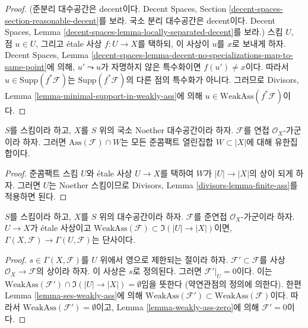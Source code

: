 \begin{proof}
(준분리 대수공간은 decent이다. Decent Spaces, Section
\ref{decent-spaces-section-reasonable-decent}를 보라.
국소 분리 대수공간은 decent이다. Decent Spaces, Lemma
\ref{decent-spaces-lemma-locally-separated-decent}를 보라.)
스킴 $U$, 점 $u \in U$, 그리고 \'etale 사상
$f : U \to X$를 택하되, 이 사상이 $u$를 $x$로 보내게 하자.
Decent Spaces, Lemma
\ref{decent-spaces-lemma-decent-no-specializations-map-to-same-point}에 의해,
$u' \leadsto u$가 자명하지 않은 특수화이면 $f(u') \not = x$이다.
따라서 $u \in \text{Supp}(f^*\mathcal{F})$는
$\text{Supp}(f^*\mathcal{F})$의 다른 점의 특수화가 아니다.
그러므로 Divisors, Lemma
\ref{lemma-minimal-support-in-weakly-ass}에 의해
$u \in \text{WeakAss}(f^*\mathcal{F})$이다.
\end{proof}

\begin{lemma}
\label{lemma-finite-ass}
$S$를 스킴이라 하고, $X$를 $S$ 위의 국소 Noether 대수공간이라 하자.
$\mathcal{F}$를 연접 $\mathcal{O}_X$-가군이라 하자. 그러면
$\text{Ass}(\mathcal{F}) \cap W$는 모든 준콤팩트 열린집합
$W \subset |X|$에 대해 유한집합이다.
\end{lemma}

\begin{proof}
준콤팩트 스킴 $U$와 \'etale 사상 $U \to X$를 택하여
$W$가 $|U| \to |X|$의 상이 되게 하자. 그러면 $U$는 Noether 스킴이므로
Divisors, Lemma \ref{divisors-lemma-finite-ass}를 적용하면 된다.
\end{proof}

\begin{lemma}
\label{lemma-restriction-injective-open-contains-weakly-ass}
$S$를 스킴이라 하고, $X$를 $S$ 위의 대수공간이라 하자.
$\mathcal{F}$를 준연접 $\mathcal{O}_X$-가군이라 하자.
$U \to X$가 \'etale 사상이고
$\text{WeakAss}(\mathcal{F}) \subset \Im(|U| \to |X|)$이면,
$\Gamma(X, \mathcal{F}) \to \Gamma(U, \mathcal{F})$는 단사이다.
\end{lemma}

\begin{proof}
$s \in \Gamma(X, \mathcal{F})$를 $U$ 위에서 영으로 제한되는 절이라 하자.
$\mathcal{F}' \subset \mathcal{F}$를 사상
$\mathcal{O}_X \to \mathcal{F}$의 상이라 하자. 이 사상은 $s$로 정의된다. 그러면
$\mathcal{F}'|_U = 0$이다. 이는
$\text{WeakAss}(\mathcal{F}') \cap \Im(|U| \to |X|) = \emptyset$임을 뜻한다
(약연관점의 정의에 의한다). 한편 Lemma
\ref{lemma-ses-weakly-ass}에 의해
$\text{WeakAss}(\mathcal{F}') \subset \text{WeakAss}(\mathcal{F})$이다.
따라서 $\text{WeakAss}(\mathcal{F}') = \emptyset$이고, Lemma
\ref{lemma-weakly-ass-zero}에 의해 $\mathcal{F}' = 0$이다.
\end{proof}

